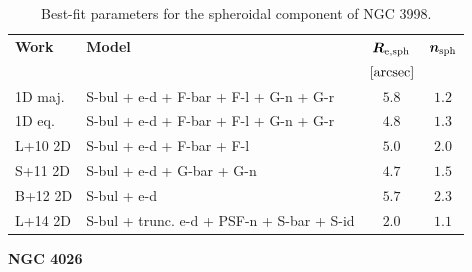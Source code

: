 \documentclass[preprint2]{emulateapj}
\begin{document}
  \begin{table}[h]
  \small
  \caption{Best-fit parameters for the spheroidal component of NGC 3998.}
  \begin{center}
  \begin{tabular}{llcc}
  \hline
  {\bf Work} & {\bf Model}   & $\bm R_{\rm e,sph}$    & $\bm n_{\rm sph}$ \\
    &  &  $[\rm arcsec]$ & \\
  \hline
  1D maj. & S-bul + e-d + F-bar + F-l + G-n + G-r & $5.8$  &  $1.2$ \\
  1D eq.  & S-bul + e-d + F-bar + F-l + G-n + G-r & $4.8$  &  $1.3$ \\
  \hline
  L+10 2D         & S-bul + e-d + F-bar + F-l & $5.0$  &  $2.0$ \\
  S+11 2D         & S-bul + e-d + G-bar + G-n & $4.7$  &  $1.5$ \\
  B+12 2D         & S-bul + e-d & $5.7$  &  $2.3$ \\
  L+14 2D         & S-bul + trunc. e-d + PSF-n + S-bar + S-id & $2.0$  &  $1.1$ \\
  \hline
  \end{tabular}
  \end{center}
  \label{tab:n3998}
  \end{table} 



  \clearpage\newpage\noindent
  {\bf NGC 4026 \\}
\end{document}

